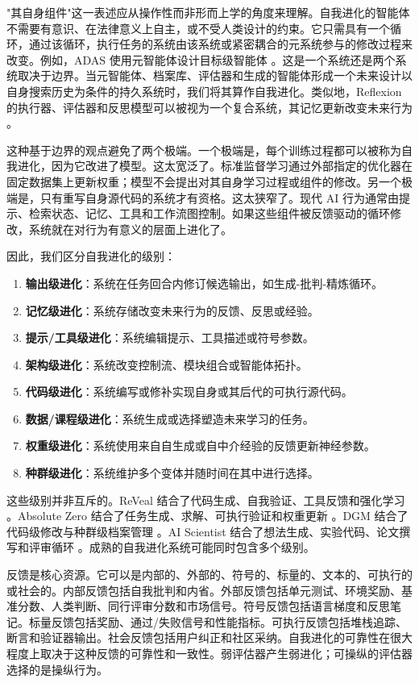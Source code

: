 "其自身组件"这一表述应从操作性而非形而上学的角度来理解。自我进化的智能体不需要有意识、在法律意义上自主，或不受人类设计的约束。它只需具有一个循环，通过该循环，执行任务的系统由该系统或紧密耦合的元系统参与的修改过程来改变。例如，ADAS 使用元智能体设计目标级智能体 \cite{adas2025}。这是一个系统还是两个系统取决于边界。当元智能体、档案库、评估器和生成的智能体形成一个未来设计以自身搜索历史为条件的持久系统时，我们将其算作自我进化。类似地，Reflexion 的执行器、评估器和反思模型可以被视为一个复合系统，其记忆更新改变未来行为 \cite{reflexion2023}。

这种基于边界的观点避免了两个极端。一个极端是，每个训练过程都可以被称为自我进化，因为它改进了模型。这太宽泛了。标准监督学习通过外部指定的优化器在固定数据集上更新权重；模型不会提出对其自身学习过程或组件的修改。另一个极端是，只有重写自身源代码的系统才有资格。这太狭窄了。现代 AI 行为通常由提示、检索状态、记忆、工具和工作流图控制。如果这些组件被反馈驱动的循环修改，系统就在对行为有意义的层面上进化了。

因此，我们区分自我进化的级别：

\begin{enumerate}
    \item \textbf{输出级进化}：系统在任务回合内修订候选输出，如生成-批判-精炼循环。
    \item \textbf{记忆级进化}：系统存储改变未来行为的反馈、反思或经验。
    \item \textbf{提示/工具级进化}：系统编辑提示、工具描述或符号参数。
    \item \textbf{架构级进化}：系统改变控制流、模块组合或智能体拓扑。
    \item \textbf{代码级进化}：系统编写或修补实现自身或其后代的可执行源代码。
    \item \textbf{数据/课程级进化}：系统生成或选择塑造未来学习的任务。
    \item \textbf{权重级进化}：系统使用来自自生成或自中介经验的反馈更新神经参数。
    \item \textbf{种群级进化}：系统维护多个变体并随时间在其中进行选择。
\end{enumerate}

这些级别并非互斥的。ReVeal 结合了代码生成、自我验证、工具反馈和强化学习 \cite{reveal2025}。Absolute Zero 结合了任务生成、求解、可执行验证和权重更新 \cite{absolutezero2025}。DGM 结合了代码级修改与种群级档案管理 \cite{darwingodelmachine2025}。AI Scientist 结合了想法生成、实验代码、论文撰写和评审循环 \cite{aiscientist2024}。成熟的自我进化系统可能同时包含多个级别。

反馈是核心资源。它可以是内部的、外部的、符号的、标量的、文本的、可执行的或社会的。内部反馈包括自我批判和内省。外部反馈包括单元测试、环境奖励、基准分数、人类判断、同行评审分数和市场信号。符号反馈包括语言梯度和反思笔记。标量反馈包括奖励、通过/失败信号和性能指标。可执行反馈包括堆栈追踪、断言和验证器输出。社会反馈包括用户纠正和社区采纳。自我进化的可靠性在很大程度上取决于这种反馈的可靠性和一致性。弱评估器产生弱进化；可操纵的评估器选择的是操纵行为。

